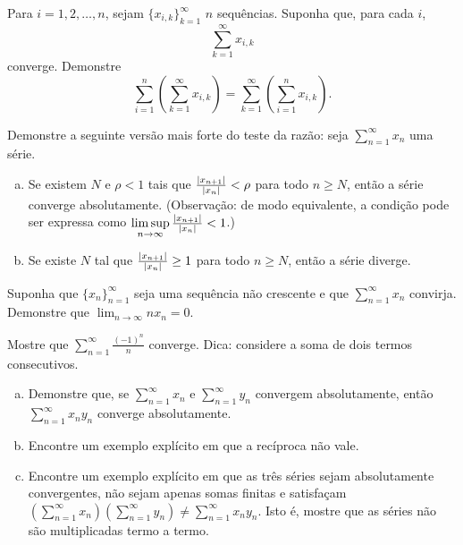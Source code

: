 \begin{exercise}
Para $i=1,2,\ldots,n$, sejam $\{ x_{i,k} \}_{k=1}^\infty$ $n$
sequências. Suponha que, para cada $i$,
\begin{equation*}
\sum_{k=1}^\infty x_{i,k}
\end{equation*}
converge. Demonstre
\begin{equation*}
\sum_{i=1}^n \left( \sum_{k=1}^\infty x_{i,k} \right)
=
\sum_{k=1}^\infty \left( \sum_{i=1}^n x_{i,k} \right) .
\end{equation*}
\end{exercise}

\begin{exercise} \label{exercise:strongerratiotest}
Demonstre a seguinte versão mais forte do teste da razão:
seja $\sum_{n=1}^\infty x_n$ uma série.
\begin{enumerate}[a)]
\item
Se existem $N$ e $\rho < 1$ tais que
$\frac{\lvert {x_{n+1}} \rvert}{\lvert {x_n} \rvert} < \rho$ para todo $n \geq N$,
então a série converge absolutamente.
(Observação: de modo equivalente, a condição pode ser expressa como
$\limsup\limits_{n\to\infty} \frac{\lvert {x_{n+1}} \rvert}{\lvert {x_n} \rvert} < 1$.)
\item
Se existe $N$ tal que
$\frac{\lvert {x_{n+1}} \rvert}{\lvert {x_n} \rvert} \geq 1$
para todo $n \geq N$,
então a série diverge. 
\end{enumerate}
\end{exercise}

\begin{exercise}[Desafiador]
Suponha que $\{ x_n \}_{n=1}^\infty$ seja uma sequência não crescente e
que $\sum_{n=1}^\infty x_n$ convirja.
Demonstre que $\displaystyle \lim_{n\to\infty} n x_n = 0$.
\end{exercise}

\begin{exercise}
Mostre que $\displaystyle \sum_{n=1}^\infty \frac{{(-1)}^n}{n}$ converge.
Dica: considere a soma de dois termos consecutivos.
\end{exercise}

\begin{exercise}
\leavevmode
\begin{enumerate}[a)]
\item Demonstre que, se $\sum_{n=1}^\infty x_n$ e $\sum_{n=1}^\infty y_n$ convergem absolutamente, então
$\sum_{n=1}^\infty x_ny_n$ converge absolutamente.
\item Encontre um exemplo explícito em que a recíproca não vale.
\item Encontre um exemplo explícito em que as três séries sejam absolutamente convergentes,
não sejam apenas somas finitas e satisfaçam
$\left(\sum_{n=1}^\infty x_n\right)\left(\sum_{n=1}^\infty y_n\right)
\neq \sum_{n=1}^\infty x_ny_n$. Isto é, mostre que as séries
não são multiplicadas termo a termo.
\end{enumerate}
\end{exercise}

